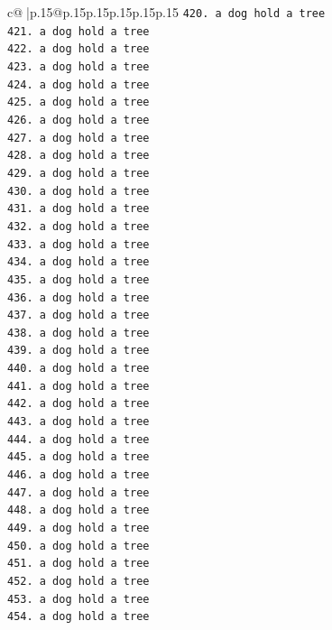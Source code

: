 \documentclass{article}
\begin{document}
{\begin{supertabular}{c@{$\;$}|p{.15\linewidth}@{}p{.15\linewidth}p{.15\linewidth}p{.15\linewidth}p{.15\linewidth}p{.15\linewidth}}
{{{\texttt{420. a dog hold a tree} \\
\texttt{421. a dog hold a tree} \\
\texttt{422. a dog hold a tree} \\
\texttt{423. a dog hold a tree} \\
\texttt{424. a dog hold a tree} \\
\texttt{425. a dog hold a tree} \\
\texttt{426. a dog hold a tree} \\
\texttt{427. a dog hold a tree} \\
\texttt{428. a dog hold a tree} \\
\texttt{429. a dog hold a tree} \\
\texttt{430. a dog hold a tree} \\
\texttt{431. a dog hold a tree} \\
\texttt{432. a dog hold a tree} \\
\texttt{433. a dog hold a tree} \\
\texttt{434. a dog hold a tree} \\
\texttt{435. a dog hold a tree} \\
\texttt{436. a dog hold a tree} \\
\texttt{437. a dog hold a tree} \\
\texttt{438. a dog hold a tree} \\
\texttt{439. a dog hold a tree} \\
\texttt{440. a dog hold a tree} \\
\texttt{441. a dog hold a tree} \\
\texttt{442. a dog hold a tree} \\
\texttt{443. a dog hold a tree} \\
\texttt{444. a dog hold a tree} \\
\texttt{445. a dog hold a tree} \\
\texttt{446. a dog hold a tree} \\
\texttt{447. a dog hold a tree} \\
\texttt{448. a dog hold a tree} \\
\texttt{449. a dog hold a tree} \\
\texttt{450. a dog hold a tree} \\
\texttt{451. a dog hold a tree} \\
\texttt{452. a dog hold a tree} \\
\texttt{453. a dog hold a tree} \\
\texttt{454. a dog hold a tree} \\
}}}
\end{supertabular}}
\end{document}
